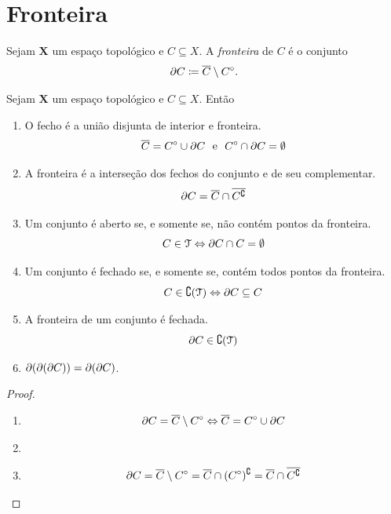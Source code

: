 \section{Fronteira}

\begin{defi}
	Sejam $\bm X$ um espaço topológico e $C \subseteq X$. A \emph{fronteira} de $C$ é o conjunto
	\begin{equation*}
	\fro{C} \coloneqq \fec{C} \setminus \inn{C}.
	\end{equation*}
\end{defi}

\begin{prop}
	Sejam $\bm X$ um espaço topológico e $C \subseteq X$. Então
	\begin{enumerate}
	\item O fecho é a união disjunta de interior e fronteira.
	\begin{equation*}
	\overline{C} = {C}^\circ \cup \partial C \text{\ \ e\ \ } {C}^\circ \cap \partial C = \emptyset
	\end{equation*}
	\item A fronteira é a interseção dos fechos do conjunto e de seu complementar.
	\begin{equation*}
	\partial C = \overline{C} \cap \overline{C^\complement}
	\end{equation*}
	\item Um conjunto é aberto se, e somente se, não contém pontos da fronteira.
	\begin{equation*}
	C \in \mathcal T \Leftrightarrow \partial C \cap C = \emptyset
	\end{equation*}
	\item Um conjunto é fechado se, e somente se, contém todos pontos da fronteira.
	\begin{equation*}
	C \in \complement(\mathcal T) \Leftrightarrow \partial C \subseteq C
	\end{equation*}
	\item A fronteira de um conjunto é fechada.
	\begin{equation*}
	\partial C \in \complement(\mathcal T)
	\end{equation*}
	\item $\partial (\partial (\partial C)) = \partial (\partial C)$.
	\end{enumerate}
\end{prop}
\begin{proof}
	\begin{enumerate}
	\item
	\begin{equation*}
	\partial C = \overline{C} \setminus {C}^\circ \Leftrightarrow \overline{C} = {C}^\circ \cup \partial C
	\end{equation*}
	\item
	\item 
	\begin{equation*}
	\partial C = \overline{C} \setminus {C}^\circ = \overline{C} \cap ({C}^\circ)^\complement = \overline{C} \cap \overline{C^\complement}
	\end{equation*}
	\end{enumerate}
\end{proof}

